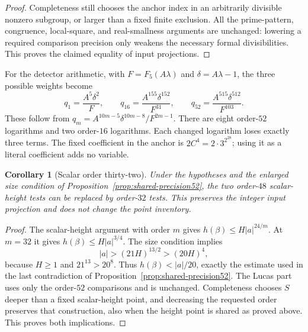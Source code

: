 \documentclass[11pt]{article}
\newtheorem{corollary}[theorem]{Corollary}
\theoremstyle{definition}
\begin{document}
\begin{proof}
Completeness still chooses the anchor index in an arbitrarily
divisible nonzero subgroup, or larger than a fixed finite exclusion.
All the prime-pattern, congruence, local-square, and real-smallness
arguments are unchanged: lowering a required comparison precision
only weakens the necessary formal divisibilities.  This proves the
claimed equality of input projections.
\end{proof}

For the detector arithmetic, with $F=F_5(A\lambda)$ and
$\delta=A\lambda-1$, the three possible weights become
\[
 q_1=\frac{A^5\delta^2}{F},\qquad
 q_{16}=\frac{A^{155}\delta^{152}}{F^{31}},\qquad
 q_{52}=\frac{A^{515}\delta^{512}}{F^{103}}.
\]
These follow from $q_m=A^{10m-5}\delta^{10m-8}/F^{2m-1}$.
There are eight order-$52$ logarithms and two order-$16$
logarithms.  Each changed logarithm loses exactly three terms.
The fixed coefficient in the anchor is $2C^4=2\cdot3^{2^{28}}$;
using it as a literal coefficient adds no variable.

\begin{corollary}[Scalar order thirty-two]
\label{cor:shared-scalar32}
Under the hypotheses and the enlarged size condition of
Proposition~\ref{prop:shared-precision52}, the two order-$48$ scalar-height
tests can be replaced by order-$32$ tests.  This preserves the integer input
projection and does not change the point inventory.
\end{corollary}
\begin{proof}
The scalar-height argument with order $m$ gives
$h(\beta)\le H|a|^{24/m}$.  At $m=32$ it gives
$h(\beta)\le H|a|^{3/4}$.  The size condition implies
\[
 |a|>(21H)^{13/2}>(20H)^4,
\]
because $H\ge1$ and $21^{13}>20^8$.  Thus
$h(\beta)<|a|/20$, exactly the estimate used in the last contradiction
of Proposition~\ref{prop:shared-precision52}.  The Lucas part uses only the
order-$52$ comparisons and is unchanged.  Completeness chooses $S$ deeper
than a fixed scalar-height point, and decreasing the requested order
preserves that construction, also when the height point is shared as
proved above.  This proves both implications.
\end{proof}
\end{document}
